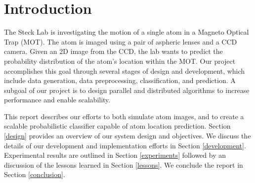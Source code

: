 \section{Introduction}

The Steck Lab is investigating the motion of a single atom in a Magneto Optical Trap (MOT).  The atom is imaged using a pair of aspheric lenses and a CCD camera.  Given an 2D image from the CCD, the lab wants to predict the probability distribution of the atom's location within the MOT. Our project accomplishes this goal through several stages of design and development, which include data generation, data preprocessing, classification, and prediction.  A subgoal of our project is to design parallel and distributed algorithms to increase performance and enable scalability.

This report describes our efforts to both simulate atom images, and to create a scalable probabilistic classifier capable of atom location prediction.  Section \ref{design} provides an overview of our system design and objectives.  We discuss the details of our development and implementation efforts in Section \ref{development}.  Experimental results are outlined in Section \ref{experiments} followed by an discussion of the lessons learned in Section \ref{lessons}. We conclude the report in Section \ref{conclusion}.